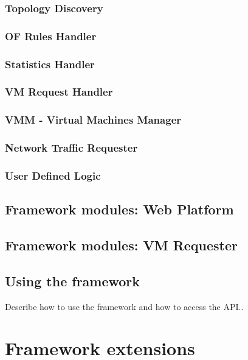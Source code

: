 \documentclass[12pt,english]{book}
\begin{document}
\subsection{Topology Discovery}

\subsection{OF Rules Handler}

\subsection{Statistics Handler}

\subsection{VM Request Handler}

\subsection{VMM - Virtual Machines Manager}

\subsection{Network Traffic Requester}

\subsection{User Defined Logic}


\section{Framework modules: Web Platform}

\section{Framework modules: VM Requester}

\section{Using the framework}

Describe how to use the framework and how to access the API..

\chapter{Framework extensions \label{cha:} }
\end{document}
